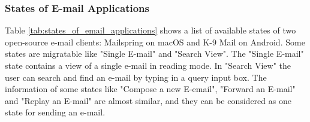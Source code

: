 \subsubsection{States of E-mail Applications}

Table \ref{tab:states_of_email_applications} shows a list of available states of two open-source e-mail clients: Mailspring on macOS and K-9 Mail on Android. Some states are migratable like "Single E-mail" and "Search View". The "Single E-mail" state contains a view of a single e-mail in reading mode. In "Search View" the user can search and find an e-mail by typing in a query input box. The information of some states like "Compose a new E-email", "Forward an E-mail" and "Replay an E-mail" are almost similar, and they can be considered as one state for sending an e-mail.

